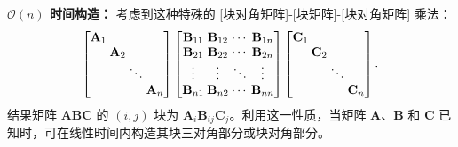 \textbf{$\mathcal{O}(n)$ 时间构造：} 考虑到这种特殊的 [块对角矩阵]-[块矩阵]-[块对角矩阵] 乘法：
\begin{equation}
  \label{eq:bmb_multiplication}
  \setlength{\arraycolsep}{1.2pt}
  \begin{bmatrix}
    \mathbf{A}_{1} &                &        &                \\
                   & \mathbf{A}_{2} &        &                \\
                   &                & \ddots &                \\
                   &                &        & \mathbf{A}_{n}
  \end{bmatrix}
  \begin{bmatrix}
    \mathbf{B}_{11} & \mathbf{B}_{12} & \cdots & \mathbf{B}_{1n} \\
    \mathbf{B}_{21} & \mathbf{B}_{22} & \cdots & \mathbf{B}_{2n} \\
    \vdots          & \vdots          & \ddots & \vdots          \\
    \mathbf{B}_{n1} & \mathbf{B}_{n2} & \cdots & \mathbf{B}_{nn} \\
  \end{bmatrix}
  \begin{bmatrix}
    \mathbf{C}_{1} &                &        &                \\
                   & \mathbf{C}_{2} &        &                \\
                   &                & \ddots &                \\
                   &                &        & \mathbf{C}_{n}
  \end{bmatrix}.
\end{equation}
结果矩阵 $\mathbf A \mathbf B \mathbf C$ 的 $(i, j)$ 块为 $\mathbf{A}_{i} \mathbf{B}_{ij} \mathbf{C}_{j}$。利用这一性质，当矩阵 $\mathbf A$、$\mathbf B$ 和 $\mathbf C$ 已知时，可在线性时间内构造其块三对角部分或块对角部分。

